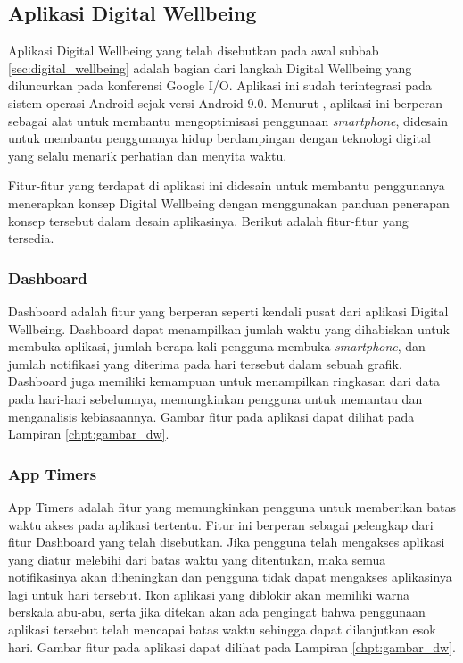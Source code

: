 \subsection{Aplikasi Digital Wellbeing}

Aplikasi Digital Wellbeing yang telah disebutkan pada awal subbab \ref{sec:digital_wellbeing} adalah bagian dari langkah Digital Wellbeing yang diluncurkan pada konferensi Google I/O. Aplikasi ini sudah terintegrasi pada sistem operasi Android sejak versi Android 9.0. \parencite{google2021dwsupport} Menurut \textcite{8976353}, aplikasi ini berperan sebagai alat untuk membantu mengoptimisasi penggunaan \textit{smartphone}, didesain untuk membantu penggunanya hidup berdampingan dengan teknologi digital yang selalu menarik perhatian dan menyita waktu.

Fitur-fitur yang terdapat di aplikasi ini didesain untuk membantu penggunanya menerapkan konsep Digital Wellbeing dengan menggunakan panduan penerapan konsep tersebut dalam desain aplikasinya. Berikut adalah fitur-fitur yang tersedia.



\subsubsection{Dashboard}
Dashboard adalah fitur yang berperan seperti kendali pusat dari aplikasi Digital Wellbeing. Dashboard dapat menampilkan jumlah waktu yang dihabiskan untuk membuka aplikasi, jumlah berapa kali pengguna membuka \textit{smartphone}, dan jumlah notifikasi yang diterima pada hari tersebut dalam sebuah grafik. \parencite{android2019digitalwellbeing} Dashboard juga memiliki kemampuan untuk menampilkan ringkasan dari data pada hari-hari sebelumnya, memungkinkan pengguna untuk memantau dan menganalisis kebiasaannya. Gambar fitur pada aplikasi dapat dilihat pada Lampiran \ref{chpt:gambar_dw}.

\subsubsection{App Timers}
App Timers adalah fitur yang memungkinkan pengguna untuk memberikan batas waktu akses pada aplikasi tertentu. Fitur ini berperan sebagai pelengkap dari fitur Dashboard yang telah disebutkan. Jika pengguna telah mengakses aplikasi yang diatur melebihi dari batas waktu yang ditentukan, maka semua notifikasinya akan diheningkan dan pengguna tidak dapat mengakses aplikasinya lagi untuk hari tersebut. \parencite{android2019digitalwellbeing} Ikon aplikasi yang diblokir akan memiliki warna berskala abu-abu, serta jika ditekan akan ada pengingat bahwa penggunaan aplikasi tersebut telah mencapai batas waktu sehingga dapat dilanjutkan esok hari. Gambar fitur pada aplikasi dapat dilihat pada Lampiran \ref{chpt:gambar_dw}.

